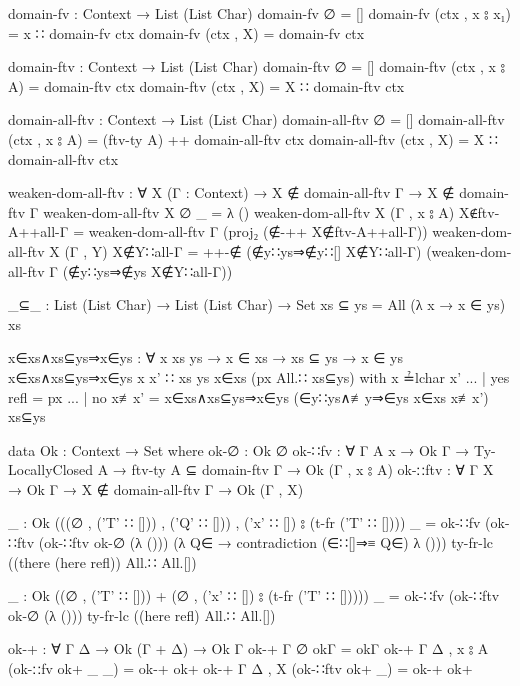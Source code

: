 \documentclass[logo,bsc,singlespacing,parskip,online]{infthesis}
\renewenvironment{code}{\mintedcopy[breaklines,breaksymbolleft=\;]{agda}}{\endmintedcopy}
\begin{document}
\begin{code}
  domain-fv : Context → List (List Char)
  domain-fv ∅ = []
  domain-fv (ctx , x ⦂ x₁) = x ∷ domain-fv ctx
  domain-fv (ctx , X) = domain-fv ctx

  domain-ftv : Context → List (List Char)
  domain-ftv ∅ = []
  domain-ftv (ctx , x ⦂ A) = domain-ftv ctx
  domain-ftv (ctx , X) = X ∷ domain-ftv ctx

  domain-all-ftv : Context → List (List Char)
  domain-all-ftv ∅ = []
  domain-all-ftv (ctx , x ⦂ A) = (ftv-ty A) ++ domain-all-ftv ctx
  domain-all-ftv (ctx , X) = X ∷ domain-all-ftv ctx

  weaken-dom-all-ftv : ∀ {X} (Γ : Context) → X ∉ domain-all-ftv Γ → X ∉ domain-ftv Γ
  weaken-dom-all-ftv {X} ∅ _ = λ ()
  weaken-dom-all-ftv {X} (Γ , x ⦂ A) X∉ftv-A++all-Γ =
    weaken-dom-all-ftv Γ (proj₂ (∉-++ X∉ftv-A++all-Γ))
  weaken-dom-all-ftv {X} (Γ , Y) X∉Y∷all-Γ =
    ++-∉
      (∉y∷ys⇒∉y∷[] X∉Y∷all-Γ)
      (weaken-dom-all-ftv Γ (∉y∷ys⇒∉ys X∉Y∷all-Γ))

  _⊆_ : List (List Char) → List (List Char) → Set
  xs ⊆ ys = All (λ x → x ∈ ys) xs

  x∈xs∧xs⊆ys⇒x∈ys : ∀ {x xs ys} → x ∈ xs → xs ⊆ ys → x ∈ ys
  x∈xs∧xs⊆ys⇒x∈ys {x} {x' ∷ xs} {ys} x∈xs (px All.∷ xs⊆ys) with x ≟lchar x'
  ... | yes refl = px
  ... | no  x≢x' = x∈xs∧xs⊆ys⇒x∈ys (∈y∷ys∧≢y⇒∈ys x∈xs x≢x') xs⊆ys

  data Ok : Context → Set where
    ok-∅ : Ok ∅
    ok-∷fv : ∀ {Γ A x} → Ok Γ → Ty-LocallyClosed A → ftv-ty A ⊆ domain-ftv Γ → Ok (Γ , x ⦂ A)
    ok-∷ftv : ∀ {Γ X} → Ok Γ → X ∉ domain-all-ftv Γ → Ok (Γ , X)

  _ : Ok (((∅ , ('T' ∷ [])) , ('Q' ∷ [])) , ('x' ∷ []) ⦂ (t-fr ('T' ∷ [])))
  _ = ok-∷fv (ok-∷ftv (ok-∷ftv ok-∅ (λ ())) (λ Q∈ → contradiction (∈∷[]⇒≡ Q∈) λ ())) ty-fr-lc ((there (here refl)) All.∷ All.[])

  _ : Ok ((∅ , ('T' ∷ [])) + (∅ , ('x' ∷ []) ⦂ (t-fr ('T' ∷ []))))
  _ = ok-∷fv (ok-∷ftv ok-∅ (λ ())) ty-fr-lc ((here refl) All.∷ All.[])

  ok-+ : ∀ {Γ Δ} → Ok (Γ + Δ) → Ok Γ
  ok-+ {Γ} {∅} okΓ = okΓ
  ok-+ {Γ} {Δ , x ⦂ A} (ok-∷fv ok+ _ _) = ok-+ ok+
  ok-+ {Γ} {Δ , X} (ok-∷ftv ok+ _) = ok-+ ok+
\end{code}
\end{document}
